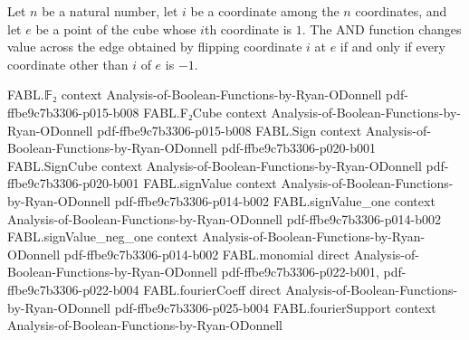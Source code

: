 \begin{theorem}
\label{FABL.isBoundaryDimensionEdge_andFunction_iff}
\leanok
{}
Let $n$ be a natural number, let $i$ be a coordinate among the $n$ coordinates, and let
$e$ be a point of the cube whose $i$th coordinate is $1$. The AND function changes value
across the edge obtained by flipping coordinate $i$ at $e$ if and only if every
coordinate other than $i$ of $e$ is $-1$.
\end{theorem}

\begin{theorem}
\label{FABL.booleanInfluence_orFunction}
\leanok
{}
\proofstep
  {FABL.𝔽₂}
  {context}
  {Analysis-of-Boolean-Functions-by-Ryan-ODonnell}
  {pdf-ffbe9c7b3306-p015-b008}
\proofstep
  {FABL.F₂Cube}
  {context}
  {Analysis-of-Boolean-Functions-by-Ryan-ODonnell}
  {pdf-ffbe9c7b3306-p015-b008}
\proofstep
  {FABL.Sign}
  {context}
  {Analysis-of-Boolean-Functions-by-Ryan-ODonnell}
  {pdf-ffbe9c7b3306-p020-b001}
\proofstep
  {FABL.SignCube}
  {context}
  {Analysis-of-Boolean-Functions-by-Ryan-ODonnell}
  {pdf-ffbe9c7b3306-p020-b001}
\proofstep
  {FABL.signValue}
  {context}
  {Analysis-of-Boolean-Functions-by-Ryan-ODonnell}
  {pdf-ffbe9c7b3306-p014-b002}
\proofstep
  {FABL.signValue_one}
  {context}
  {Analysis-of-Boolean-Functions-by-Ryan-ODonnell}
  {pdf-ffbe9c7b3306-p014-b002}
\proofstep
  {FABL.signValue_neg_one}
  {context}
  {Analysis-of-Boolean-Functions-by-Ryan-ODonnell}
  {pdf-ffbe9c7b3306-p014-b002}
\proofstep
  {FABL.monomial}
  {direct}
  {Analysis-of-Boolean-Functions-by-Ryan-ODonnell}
  {pdf-ffbe9c7b3306-p022-b001,
    pdf-ffbe9c7b3306-p022-b004}
\proofstep
  {FABL.fourierCoeff}
  {direct}
  {Analysis-of-Boolean-Functions-by-Ryan-ODonnell}
  {pdf-ffbe9c7b3306-p025-b004}
\proofstep
  {FABL.fourierSupport}
  {context}
  {Analysis-of-Boolean-Functions-by-Ryan-ODonnell}

\end{theorem}

